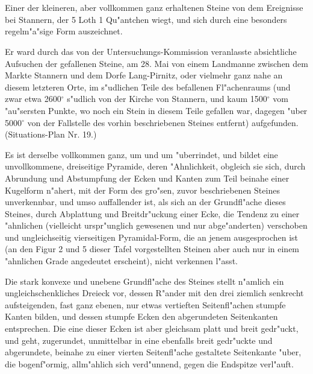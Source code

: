 \documentclass[a4paper, 11pt, oneside, german]{article}
\begin{document}
\section{}
\subsection{}
\paragraph{}
Einer der kleineren, aber vollkommen ganz erhaltenen Steine von dem Ereignisse bei Stannern, der 5 Loth 1 Qu"antchen wiegt, und sich durch eine besonders regelm"a"sige Form auszeichnet.

Er ward durch das von der Untersuchungs-Kommission veranlasste absichtliche Aufsuchen der gefallenen Steine, am 28. Mai von einem Landmanne zwischen dem Markte Stannern und dem Dorfe Lang-Pirnitz, oder vielmehr ganz nahe an diesem letzteren Orte, im s"udlichen Teile des befallenen Fl"achenraums (und zwar etwa 2600$^{\circ}$ s"udlich von der Kirche von Stannern, und kaum 1500$^{\circ}$ vom "au"sersten Punkte, wo noch ein Stein in diesem Teile gefallen war, dagegen "uber 5000$^{\circ}$ von der Fallstelle des vorhin beschriebenen Steines entfernt) aufgefunden. (Situations-Plan Nr. 19.)

Es ist derselbe vollkommen ganz, um und um "uberrindet, und bildet eine unvollkommene, dreiseitige Pyramide, deren "Ahnlichkeit, obgleich sie sich, durch Abrundung und Abstumpfung der Ecken und Kanten zum Teil beinahe einer Kugelform n"ahert, mit der Form des gro"sen, zuvor beschriebenen Steines unverkennbar, und umso auffallender ist, als sich an der Grundfl"ache dieses Steines, durch Abplattung und Breitdr"uckung einer Ecke, die Tendenz zu einer "ahnlichen (vielleicht urspr"unglich gewesenen und nur abge"anderten) verschoben und ungleichseitig vierseitigen Pyramidal-Form, die an jenem ausgesprochen ist (an den Figur 2 und 5 dieser Tafel vorgestellten Steinen aber auch nur in einem "ahnlichen Grade angedeutet erscheint), nicht verkennen l"asst.

Die stark konvexe und unebene Grundfl"ache des Steines stellt n"amlich ein ungleichschenkliches Dreieck vor, dessen R"ander mit den drei ziemlich senkrecht aufsteigenden, fast ganz ebenen, nur etwas vertieften Seitenfl"achen stumpfe Kanten bilden, und dessen stumpfe Ecken den abgerundeten Seitenkanten entsprechen. Die eine dieser Ecken ist aber gleichsam platt und breit gedr"uckt, und geht, zugerundet, unmittelbar in eine ebenfalls breit gedr"uckte und abgerundete, beinahe zu einer vierten Seitenfl"ache gestaltete Seitenkante "uber, die bogenf"ormig, allm"ahlich sich verd"unnend, gegen die Endspitze verl"auft.
\end{document}

